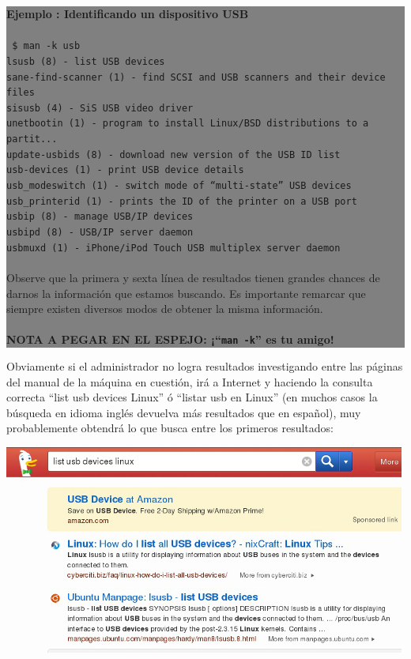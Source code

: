 \documentclass[12pt]{article}
\begin{document}
\colorbox{grey}{\parbox[t]{0.95\linewidth}{ \vspace*{0.5cm} { 
{\bf Ejemplo : Identificando un dispositivo USB} \\ \\
{\tt 
\$ man -k usb \\
lsusb (8)            - list USB devices\\
sane-find-scanner (1) - find SCSI and USB scanners and their device files\\
sisusb (4)           - SiS USB video driver\\
unetbootin (1)       - program to install Linux/BSD distributions to a partit...\\
update-usbids (8)    - download new version of the USB ID list\\
usb-devices (1)      - print USB device details\\
usb\_modeswitch (1)   - switch mode of ``multi-state'' USB devices\\
usb\_printerid (1)    - prints the ID of the printer on a USB port\\
usbip (8)            - manage USB/IP devices\\
usbipd (8)           - USB/IP server daemon\\
usbmuxd (1)          - iPhone/iPod Touch USB multiplex server daemon\\ \\
}
Observe que la primera y sexta línea de resultados tienen grandes chances 
de darnos la información que estamos buscando. Es importante remarcar que
siempre existen diversos modos de obtener la misma información. \\ 
\\
{\bf NOTA A PEGAR EN EL ESPEJO: ¡``{\tt man -k}'' es tu amigo! }
} \vspace*{0.5cm} } } 

Obviamente si el administrador no logra resultados investigando entre las 
páginas del manual de la máquina en cuestión, irá a Internet y haciendo la consulta
correcta ``list usb devices Linux'' ó ``listar usb en Linux'' (en 
muchos casos la búsqueda en idioma inglés devuelva más resultados que en español),  
muy probablemente obtendrá lo que busca entre los primeros resultados: 

\begin{center}
 \includegraphics{lsusb.jpg}
\end{center}
\end{document}
